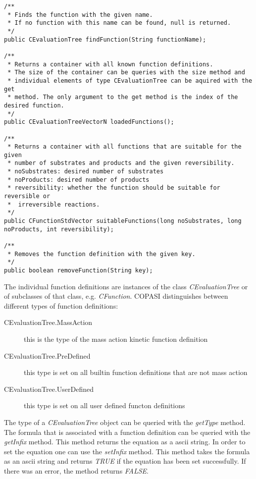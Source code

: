 \documentclass[a4,12pt]{article}
\begin{document}
\begin{lstlisting}
/**
 * Finds the function with the given name.
 * If no function with this name can be found, null is returned.
 */
public CEvaluationTree findFunction(String functionName);

/**
 * Returns a container with all known function definitions.
 * The size of the container can be queries with the size method and
 * individual elements of type CEvaluationTree can be aquired with the get
 * method. The only argument to the get method is the index of the desired function.
 */  
public CEvaluationTreeVectorN loadedFunctions();

/**
 * Returns a container with all functions that are suitable for the given
 * number of substrates and products and the given reversibility.
 * noSubstrates: desired number of substrates
 * noProducts: desired number of products
 * reversibility: whether the function should be suitable for reversible or
 *  irreversible reactions.
 */  
public CFunctionStdVector suitableFunctions(long noSubstrates, long noProducts, int reversibility);

/**
 * Removes the function definition with the given key.
 */
public boolean removeFunction(String key);
\end{lstlisting}

The individual function definitions are instances of the class \textit{CEvaluationTree} or of subclasses of that class, e.g. \textit{CFunction}.
COPASI distinguishes between different types of function definitions:

\begin{description}
\item[CEvaluationTree.MassAction]{this is the type of the mass action kinetic function definition}
\item[CEvaluationTree.PreDefined]{this type is set on all builtin function definitions that are not mass action}
\item[CEvaluationTree.UserDefined]{this type is set on all user defined functon definitions}
\end{description}

The type of a \textit{CEvaluationTree} object can be queried with the \textit{getType} method. 
The formula that is associated with a function definition can be queried with the \textit{getInfix} method. This method returns the equation as a ascii string. In order to set the equation one can use the \textit{setInfix} method. This method takes the formula as an ascii string and returns \textit{TRUE} if the equation has been set successfully. If there was an error, the method returns \textit{FALSE}. 
\end{document}
